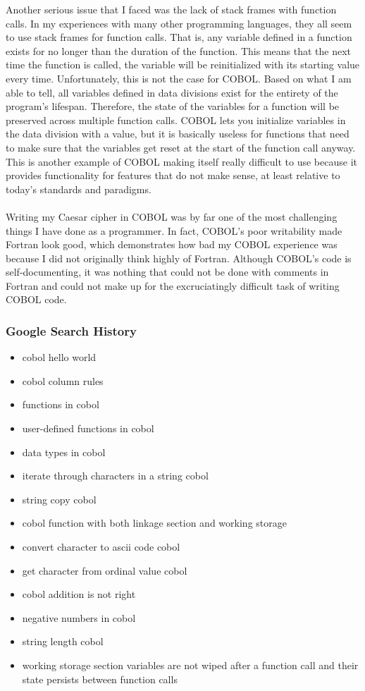 \documentclass[letterpaper, 10pt, DIV=13]{scrartcl}
\numberwithin{equation}{section}
\numberwithin{figure}{section}
\numberwithin{table}{section}
\begin{document}
Another serious issue that I faced was the lack of stack frames with function calls. In my experiences with many other programming languages, they all seem to use stack frames for function calls. That is, any variable defined in a function exists for no longer than the duration of the function. This means that the next time the function is called, the variable will be reinitialized with its starting value every time. Unfortunately, this is not the case for COBOL. Based on what I am able to tell, all variables defined in data divisions exist for the entirety of the program's lifespan. Therefore, the state of the variables for a function will be preserved across multiple function calls. COBOL lets you initialize variables in the data division with a value, but it is basically useless for functions that need to make sure that the variables get reset at the start of the function call anyway. This is another example of COBOL making itself really difficult to use because it provides functionality for features that do not make sense, at least relative to today's standards and paradigms.
\\ \\
Writing my Caesar cipher in COBOL was by far one of the most challenging things I have done as a programmer. In fact, COBOL's poor writability made Fortran look good, which demonstrates how bad my COBOL experience was because I did not originally think highly of Fortran. Although COBOL's code is self-documenting, it was nothing that could not be done with comments in Fortran and could not make up for the excruciatingly difficult task of writing COBOL code.

\subsubsection{Google Search History}
\begin{itemize}
	\item cobol hello world
	\item cobol column rules
	\item functions in cobol
	\item user-defined functions in cobol
	\item data types in cobol
	\item iterate through characters in a string cobol
	\item string copy cobol
	\item cobol function with both linkage section and working storage
	\item convert character to ascii code cobol
	\item get character from ordinal value cobol
	\item cobol addition is not right
	\item negative numbers in cobol
	\item string length cobol
	\item working storage section variables are not wiped after a function call and their state persists between function calls
\end{itemize}
\end{document}
